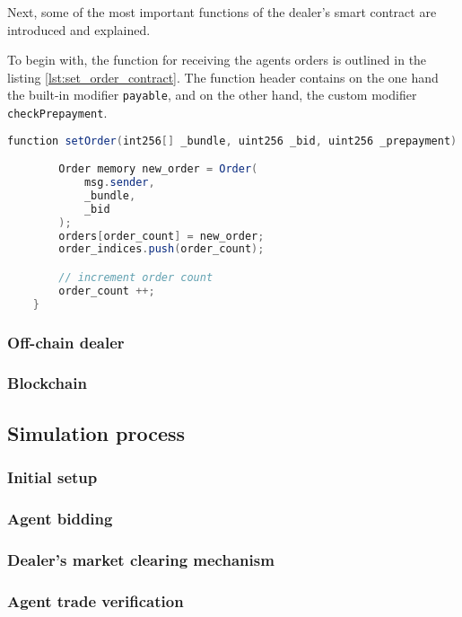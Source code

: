 Next, some of the most important functions of the dealer's smart contract are introduced and explained.

To begin with, the function for receiving the agents orders is outlined in the listing \ref{lst:set_order_contract}.
The function header contains on the one hand the built-in modifier \verb|payable|, and on the other hand, the custom
modifier \verb|checkPrepayment|.

\begin{lstlisting}[float=htbp, label=lst:set_order_contract, caption=Receiving agents orders, language=Java]
    function setOrder(int256[] _bundle, uint256 _bid, uint256 _prepayment) public payable checkPrepayment(_prepayment) {

        Order memory new_order = Order(
            msg.sender,
            _bundle,
            _bid
        );
        orders[order_count] = new_order;
        order_indices.push(order_count);

        // increment order count
        order_count ++;
    }
\end{lstlisting}

\begin{comment}
    
\end{comment}


\subsubsection{Off-chain dealer}

\subsubsection{Blockchain}

\subsection{Simulation process}

\subsubsection{Initial setup}

\subsubsection{Agent bidding}

\subsubsection{Dealer's market clearing mechanism}

\subsubsection{Agent trade verification}